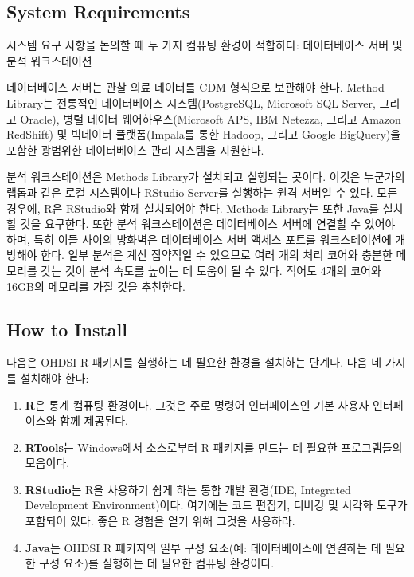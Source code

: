 \documentclass[11pt]{book}
\providecommand{\tightlist}{%
  \setlength{\itemsep}{0pt}\setlength{\parskip}{0pt}}
\theoremstyle{definition}
\theoremstyle{definition}
\theoremstyle{definition}
\theoremstyle{remark}
\begin{document}
\subsection{System Requirements}\label{system-requirements}

시스템 요구 사항을 논의할 때 두 가지 컴퓨팅 환경이 적합하다:
데이터베이스 서버 및 분석 워크스테이션 

데이터베이스 서버는 관찰 의료 데이터를 CDM 형식으로 보관해야 한다.
Method Library는 전통적인 데이터베이스 시스템(PostgreSQL, Microsoft SQL
Server, 그리고 Oracle), 병렬 데이터 웨어하우스(Microsoft APS, IBM
Netezza, 그리고 Amazon RedShift) 및 빅데이터 플랫폼(Impala를 통한
Hadoop, 그리고 Google BigQuery)을 포함한 광범위한 데이터베이스 관리
시스템을 지원한다.

분석 워크스테이션은 Methods Library가 설치되고 실행되는 곳이다. 이것은
누군가의 랩톱과 같은 로컬 시스템이나 RStudio Server를 실행하는 원격
서버일 수 있다. 모든 경우에, R은 RStudio와 함께 설치되어야 한다. Methods
Library는 또한 Java를 설치할 것을 요구한다. 또한 분석 워크스테이션은
데이터베이스 서버에 연결할 수 있어야 하며, 특히 이들 사이의 방화벽은
데이터베이스 서버 액세스 포트를 워크스테이션에 개방해야 한다. 일부
분석은 계산 집약적일 수 있으므로 여러 개의 처리 코어와 충분한 메모리를
갖는 것이 분석 속도를 높이는 데 도움이 될 수 있다. 적어도 4개의 코어와
16GB의 메모리를 가질 것을 추천한다.

\subsection{How to Install}\label{installR}

다음은 OHDSI R 패키지를 실행하는 데 필요한 환경을 설치하는 단계다. 다음
네 가지를 설치해야 한다: 

\begin{enumerate}
\def\labelenumi{\arabic{enumi}.}
\tightlist
\item
  \textbf{R}은 통계 컴퓨팅 환경이다. 그것은 주로 명령어 인터페이스인
  기본 사용자 인터페이스와 함께 제공된다.
\item
  \textbf{RTools}는 Windows에서 소스로부터 R 패키지를 만드는 데 필요한
  프로그램들의 모음이다.
\item
  \textbf{RStudio}는 R을 사용하기 쉽게 하는 통합 개발 환경(IDE,
  Integrated Development Environment)이다. 여기에는 코드 편집기, 디버깅
  및 시각화 도구가 포함되어 있다. 좋은 R 경험을 얻기 위해 그것을
  사용하라.
\item
  \textbf{Java}는 OHDSI R 패키지의 일부 구성 요소(예: 데이터베이스에
  연결하는 데 필요한 구성 요소)를 실행하는 데 필요한 컴퓨팅 환경이다.
\end{enumerate}
\end{document}
